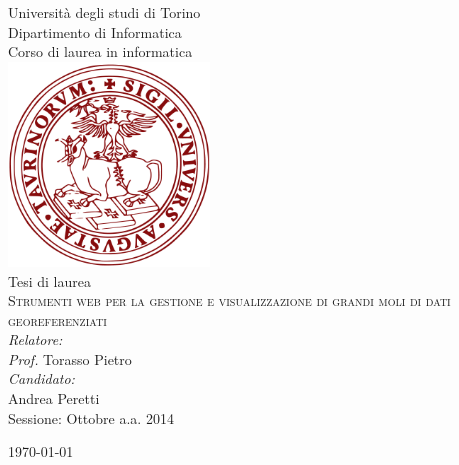 \begin{titlepage}
\begin{center}

{\LARGE Università degli studi di Torino}\\
{Dipartimento di Informatica}\\[1cm]

{\Large Corso di laurea in informatica}\\[0.5cm]
\includegraphics[width=0.40\textwidth]{img/unitologo.png}~\\[0.5cm]

{Tesi di laurea}\\[1cm]
\textsc{\LARGE Strumenti web per la gestione e visualizzazione di grandi moli di dati georeferenziati}\\[1.5cm]


{\emph{Relatore:}}\\
{\emph{Prof.} Torasso Pietro}\\[1cm]

{\emph{Candidato:}}\\
{Andrea Peretti}\\[1.5cm]
{\Large Sessione:}
{Ottobre a.a. 2014}




\vfill

{\large \today}

\end{center}
\end{titlepage}
